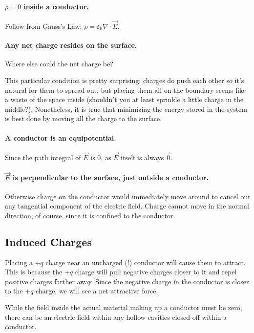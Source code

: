 \paragraph{$\rho=0$ inside a conductor.} Follow from Gauss's Law: $\rho=\varepsilon_0\nabla\cdot \vec{E}$.

\paragraph{Any net charge resides on the surface.} Where else could the net charge be?

\begin{remark}
This particular condition is pretty surprising: charges do push each other so it's natural for them to spread out, but placing them all on the boundary seems like a waste of the space inside (shouldn't you at least sprinkle a little charge in the middle?). Nonetheless, it is true that minimizing the energy stored in the system is best done by moving all the charge to the surface.
\end{remark}

\paragraph{A conductor is an equipotential.} Since the path integral of $\vec{E}$ is $0$, as $\vec{E}$ itself is always $\vec{0}$.

\paragraph{$\vec{E}$ is perpendicular to the surface, just outside a conductor.} Otherwise charge on the conductor would immediately move around to cancel out any tangential component of the electric field. Charge cannot move in the normal direction, of course, since it is confined to the conductor.

\subsection{Induced Charges}

Placing a $+q$ charge near an uncharged (!) conductor will cause them to attract. This is because the $+q$ charge will pull negative charges closer to it and repel positive charges farther away. Since the negative charge in the conductor is closer to the $+q$ charge, we will see a net attractive force.

While the field inside the actual material making up a conductor must be zero, there can be an electric field within any hollow cavities closed off within a conductor. 

